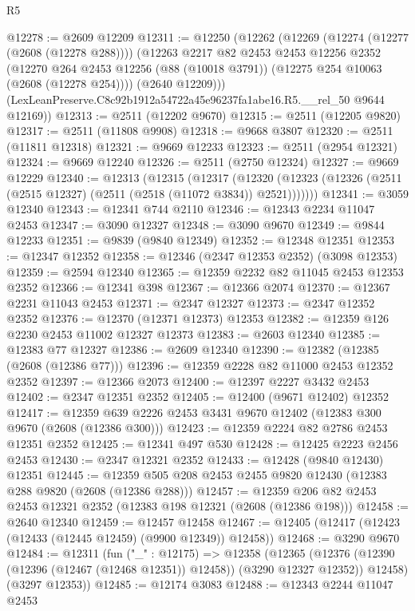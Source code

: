\begin{lexlean}{R5}
\begin{coremodule}
@12278 := @2609 @12209
@12311 := @12250
    (@12262
      (@12269
        (@12274 (@12277 (@2608 (@12278 @288))))
        (@12263
          @2217
          @82
          @2453
          @2453
          @12256
          @2352
          (@12270 @264 @2453 @12256 (@88 (@10018 @3791)) (@12275 @254 @10063 (@2608 (@12278 @254))))
          (@2640 @12209)))
      (LexLeanPreserve.C8c92b1912a54722a45e96237fa1abe16.R5.__rel_50 @9644 @12169))
@12313 := @2511 (@12202 @9670)
@12315 := @2511 (@12205 @9820)
@12317 := @2511 (@11808 @9908)
@12318 := @9668 @3807
@12320 := @2511 (@11811 @12318)
@12321 := @9669 @12233
@12323 := @2511 (@2954 @12321)
@12324 := @9669 @12240
@12326 := @2511 (@2750 @12324)
@12327 := @9669 @12229
@12340 := @12313
    (@12315
      (@12317
        (@12320 (@12323 (@12326 (@2511 (@2515 @12327) (@2511 (@2518 (@11072 @3834)) @2521)))))))
@12341 := @3059 @12340
@12343 := @12341 @744 @2110
@12346 := @12343 @2234 @11047 @2453
@12347 := @3090 @12327
@12348 := @3090 @9670
@12349 := @9844 @12233
@12351 := @9839 (@9840 @12349)
@12352 := @12348 @12351
@12353 := @12347 @12352
@12358 := @12346 (@2347 @12353 @2352) (@3098 @12353)
@12359 := @2594 @12340
@12365 := @12359 @2232 @82 @11045 @2453 @12353 @2352
@12366 := @12341 @398
@12367 := @12366 @2074
@12370 := @12367 @2231 @11043 @2453
@12371 := @2347 @12327
@12373 := @2347 @12352 @2352
@12376 := @12370 (@12371 @12373) @12353
@12382 := @12359 @126 @2230 @2453 @11002 @12327 @12373
@12383 := @2603 @12340
@12385 := @12383 @77 @12327
@12386 := @2609 @12340
@12390 := @12382 (@12385 (@2608 (@12386 @77)))
@12396 := @12359 @2228 @82 @11000 @2453 @12352 @2352
@12397 := @12366 @2073
@12400 := @12397 @2227 @3432 @2453
@12402 := @2347 @12351 @2352
@12405 := @12400 (@9671 @12402) @12352
@12417 := @12359 @639 @2226 @2453 @3431 @9670 @12402 (@12383 @300 @9670 (@2608 (@12386 @300)))
@12423 := @12359 @2224 @82 @2786 @2453 @12351 @2352
@12425 := @12341 @497 @530
@12428 := @12425 @2223 @2456 @2453
@12430 := @2347 @12321 @2352
@12433 := @12428 (@9840 @12430) @12351
@12445 := @12359 @505 @208 @2453 @2455 @9820 @12430 (@12383 @288 @9820 (@2608 (@12386 @288)))
@12457 := @12359 @206 @82 @2453 @2453 @12321 @2352 (@12383 @198 @12321 (@2608 (@12386 @198)))
@12458 := @2640 @12340
@12459 := @12457 @12458
@12467 := @12405 (@12417 (@12423 (@12433 (@12445 @12459) (@9900 @12349)) @12458))
@12468 := @3290 @9670
@12484 := @12311
    (fun ("_" : @12175) =>
    @12358
      (@12365
        (@12376 (@12390 (@12396 (@12467 (@12468 @12351)) @12458)) (@3290 @12327 @12352))
        @12458)
      (@3297 @12353))
@12485 := @12174 @3083
@12488 := @12343 @2244 @11047 @2453

\end{coremodule}
\end{lexlean}

